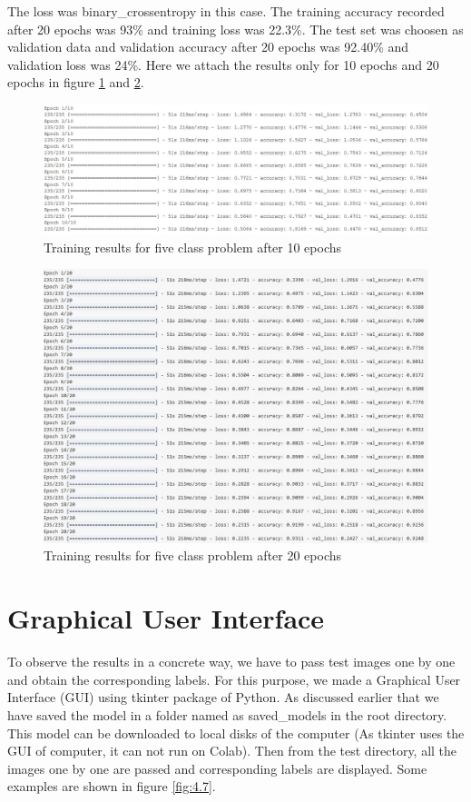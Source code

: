   The loss was binary\_crossentropy in this case. 
  The training accuracy recorded after 20 epochs was 93\% and training
  loss was 22.3\%. The test set was choosen as validation data and
  validation accuracy after 20 epochs 
  was 92.40\% and validation loss was 24\%.
  Here we attach the results only for 10 epochs and 20 epochs
  in figure \ref{fig:4.5} and \ref{fig:4.6}.
\begin{figure}[H]
    \centering
    \captionsetup{justification = centering}
    \includegraphics[scale = 0.53]{CHAPTERS/Chapter-4/Images/4.5}
    \caption{Training results for five class problem after 10 epochs} 
    \label{fig:4.5}
\end{figure}
\begin{figure}[H]
    \centering
    \captionsetup{justification = centering}
    \includegraphics[scale = 0.68]{CHAPTERS/Chapter-4/Images/4.6}
    \caption{Training results for five class problem after 20 epochs} 
    \label{fig:4.6}
\end{figure}
\section{Graphical User Interface}
To observe the results in a concrete way, we have to pass test images
one by one and obtain the corresponding labels. For this purpose,
we made a Graphical User Interface (GUI) using tkinter package of Python.
As discussed earlier that we have saved the model in a folder named
as saved\_models in the root directory. This model can be downloaded to local
disks of the computer (As tkinter uses the GUI of computer, it can not
run on Colab). Then from the test directory, all the images one by one are passed
and corresponding labels are displayed. Some examples are shown in
figure \ref{fig:4.7}.

